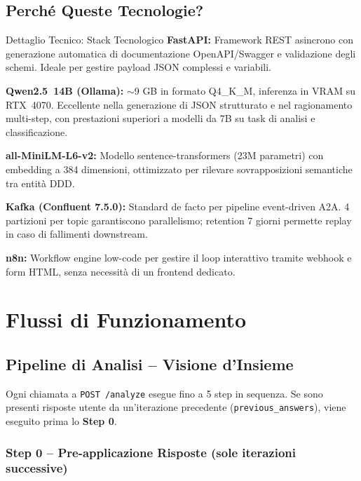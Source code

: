 \documentclass[12pt,a4paper]{report}
\begin{document}
\section{Perché Queste Tecnologie?}
\begin{technicalbox}{Dettaglio Tecnico: Stack Tecnologico}
\textbf{FastAPI:} Framework REST asincrono con generazione automatica di
documentazione OpenAPI/Swagger e validazione degli schemi. Ideale per gestire
payload JSON complessi e variabili.

\textbf{Qwen2.5~14B (Ollama):} $\sim$9 GB in formato Q4\_K\_M, inferenza in VRAM
su RTX~4070. Eccellente nella generazione di JSON strutturato e nel ragionamento
multi-step, con prestazioni superiori a modelli da 7B su task di analisi e classificazione.

\textbf{all-MiniLM-L6-v2:} Modello sentence-transformers (23M parametri) con
embedding a 384 dimensioni, ottimizzato per rilevare sovrapposizioni semantiche
tra entità DDD.

\textbf{Kafka (Confluent 7.5.0):} Standard de facto per pipeline event-driven
A2A. 4 partizioni per topic garantiscono parallelismo; retention 7 giorni
permette replay in caso di fallimenti downstream.

\textbf{n8n:} Workflow engine low-code per gestire il loop interattivo tramite
webhook e form HTML, senza necessità di un frontend dedicato.
\end{technicalbox}

\chapter{Flussi di Funzionamento}

\section{Pipeline di Analisi -- Visione d'Insieme}

Ogni chiamata a \texttt{POST /analyze} esegue fino a 5 step in sequenza.
Se sono presenti risposte utente da un'iterazione precedente
(\texttt{previous\_answers}), viene eseguito prima lo \textbf{Step 0}.

\subsection{Step 0 -- Pre-applicazione Risposte (sole iterazioni successive)}
\end{document}
